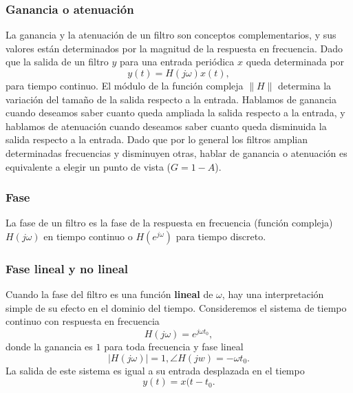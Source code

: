 \subsubsection{Ganancia o atenuaci\'{o}n}

La ganancia y la atenuaci\'{o}n de un filtro son conceptos complementarios, y sus valores est\'{a}n 
determinados por la magnitud de la respuesta en frecuencia. Dado que la salida de un filtro $y$ para
una entrada peri\'{o}dica $x$ queda determinada por 
\begin{equation}
        y(t) = H(j \omega) x(t),
\end{equation}
para tiempo continuo. El m\'{o}dulo de la funci\'{o}n compleja $\| H \|$ determina la 
variaci\'{o}n del tama\~{n}o de la salida respecto a la entrada. Hablamos de ganancia cuando deseamos 
saber cuanto queda ampliada la salida respecto a la entrada, y hablamos de atenuaci\'{o}n cuando deseamos 
saber cuanto queda disminuida la salida respecto a la entrada. Dado que por lo general
los filtros amplian determinadas frecuencias y disminuyen otras, hablar de ganancia o atenuaci\'{o}n es 
equivalente a elegir un punto de vista ($G = 1 - A$).

\subsubsection{Fase}

La fase de un filtro es la fase de la respuesta en frecuencia (funci\'{o}n compleja) $H(j \omega)$ en 
tiempo continuo o $H(e^{j \omega})$ para tiempo discreto.

\subsubsection{Fase lineal y no lineal}

Cuando la fase del filtro es una funci\'{o}n \textbf{lineal} de $\omega$, hay una interpretaci\'{o}n 
simple de su efecto en el dominio del tiempo. Consideremos el sistema de tiempo continuo con respuesta en 
frecuencia
\begin{equation}
        H( j \omega) = e^{j \omega t_{0}},
\end{equation}
donde la ganancia es $1$ para toda frecuencia y fase lineal
\begin{equation}
        |H(j \omega)| = 1, \angle H(j w) = -\omega t_{0}.
\end{equation}
La salida de este sistema es igual a su entrada desplazada en el tiempo
\begin{equation}
        y(t) = x(t - t_{0}.
\end{equation}

